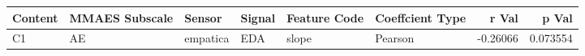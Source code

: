 \begin{tabular}{llllllrr}
\toprule
Content & MMAES Subscale &   Sensor & Signal & Feature Code & Coeffcient Type &    r Val &    p Val \\
\midrule
     C1 &             AE & empatica &    EDA &        slope &         Pearson & -0.26066 & 0.073554 \\
\bottomrule
\end{tabular}
